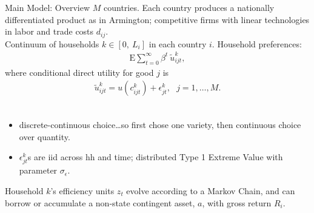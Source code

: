 \documentclass[9pt,pdftex,aspectratio=1610]{beamer}
\theoremstyle{definition}
\begin{document}
\begin{frame}[t]{Main Model: Overview}
$M$ countries. Each country produces a nationally differentiated product as in Armington; competitive firms with linear technologies in labor and trade costs $d_{ij}$.\\
\bigskip
Continuum of households $k \in [0, \ L_i]$ in each country $i$. Household preferences:
\begin{align*}
\mathrm{E}\sum_{t = 0}^{\infty} \beta^{t} \ \tilde{u}^k_{ijt},
\end{align*}
where conditional direct utility for good $j$ is
\begin{align*}
\tilde{u}^k_{ijt} =  u(c^k_{ijt}) + \epsilon^k_{jt}, \ \ \ j = 1, \ldots, M.
\end{align*}\\
\begin{itemize}
\item  discrete-continuous choice\ldots so first chose one variety, then continuous choice over quantity.
\smallskip
\item $\epsilon^k_{jt}$s are iid across hh and time; distributed Type 1 Extreme Value with parameter $\sigma_{\epsilon}$.
\end{itemize}
\bigskip
Household $k$'s efficiency units $z_t$ evolve according to a Markov Chain, and can borrow or accumulate a non-state contingent asset, $a$, with gross return $R_{i}$.
\end{frame}

\end{document}
